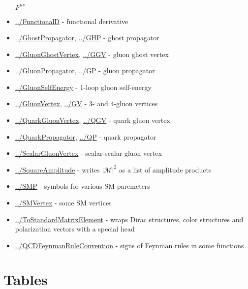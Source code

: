 \documentclass[../FeynCalcManual.tex]{subfiles}
\begin{document}
\begin{itemize}
  \(F^{\mu \nu}\)
\item
  \hyperlink{../functionald}{../FunctionalD} - functional derivative
\item
  \hyperlink{../ghostpropagator}{../GhostPropagator},
  \hyperlink{../ghp}{../GHP} - ghost propagator
\item
  \hyperlink{../gluonghostvertex}{../GluonGhostVertex},
  \hyperlink{../ggv}{../GGV} - gluon ghost vertex
\item
  \hyperlink{../gluonpropagator}{../GluonPropagator},
  \hyperlink{../gp}{../GP} - gluon propagator
\item
  \hyperlink{../gluonselfenergy}{../GluonSelfEnergy} - 1-loop gluon
  self-energy
\item
  \hyperlink{../gluonvertex}{../GluonVertex}, \hyperlink{../gv}{../GV} -
  \(3\)- and \(4\)-gluon vertices
\item
  \hyperlink{../quarkgluonvertex}{../QuarkGluonVertex},
  \hyperlink{../qgv}{../QGV} - quark gluon vertex
\item
  \hyperlink{../quarkpropagator}{../QuarkPropagator},
  \hyperlink{../qp}{../QP} - quark propagator
\item
  \hyperlink{../scalargluonvertex}{../ScalarGluonVertex} -
  scalar-scalar-gluon vertex
\item
  \hyperlink{../squareamplitude}{../SquareAmplitude} - writes
  \(|\mathcal{M}|^2\) as a list of amplitude products
\item
  \hyperlink{../smp}{../SMP} - symbols for various SM paremeters
\item
  \hyperlink{../smvertex}{../SMVertex} - some SM vertices
\item
  \hyperlink{../tostandardmatrixelement}{../ToStandardMatrixElement} -
  wraps Dirac structures, color structures and polarization vectors with
  a special head
\item
  \hyperlink{../qcdfeynmanruleconvention}{../QCDFeynmanRuleConvention} -
  signs of Feynman rules in some functions
\end{itemize}

\hypertarget{tables}{
\section{Tables}\label{tables}}
\end{document}
